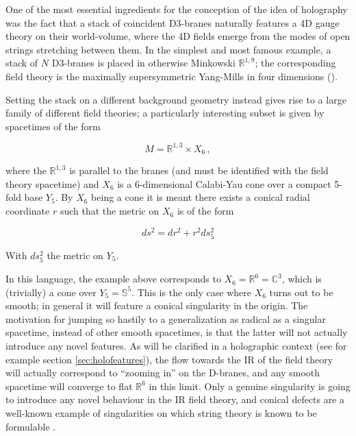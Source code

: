 \label{chap:cones}One of the most essential ingredients for the conception of the idea of holography was the fact that a stack of coincident D3-branes naturally features a 4D gauge theory on their world-volume, where the 4D fields emerge from the modes of open strings stretching between them. In the simplest and most famous example, a stack of $N$ D3-branes is placed in otherwise Minkowski $\mathbb{R}^{1,9}$; the corresponding field theory is the maximally supersymmetric Yang-Mills in four dimensions (\SYM).

Setting the stack on a different background geometry instead gives rise to a large family of different field theories; a particularly interesting subset is given by spacetimes of the form

\begin{equation} 
	M = \mathbb{R}^{1,3} \times X_6 \,,
\end{equation}

where the $\mathbb{R}^{1,3}$ is parallel to the branes (and must be identified with the field theory spacetime) and $X_6$ is a 6-dimensional Calabi-Yau cone over a compact 5-fold base $Y_5$. By $X_6$ being a cone it is meant there exists a conical radial coordinate $r$ such that the metric on $X_6$ is of the form

\begin{equation}
	ds^2 = dr^2 + r^2 ds_5^2
	\label{}
\end{equation}

With $ds_5^2$ the metric on $Y_5$.

In this language, the \SYM example above corresponds to $X_6 = \mathbb{R}^6 = \mathbb{C}^3$, which is (trivially) a cone over $Y_5 = \mathbb{S}^5$. This is the only case where $X_6$ turns out to be smooth; in general it will feature a conical singularity in the origin. The motivation for jumping so hastily to a generalization as radical as a singular spacetime, instead of other smooth spacetimes, is that the latter will not actually introduce any novel features. As will be clarified in a holographic context (see for example section \ref{sec:holofeatures}), the flow towards the IR of the field theory will actually correspond to ``zooming in'' on the D-branes, and any smooth spacetime will converge to flat $\mathbb{R}^6$ in this limit. Only a genuine singularity is going to introduce any novel behaviour in the IR field theory, and conical defects are a well-known example of singularities on which string theory is known to be formulable \cite{dixon1985strings}.

